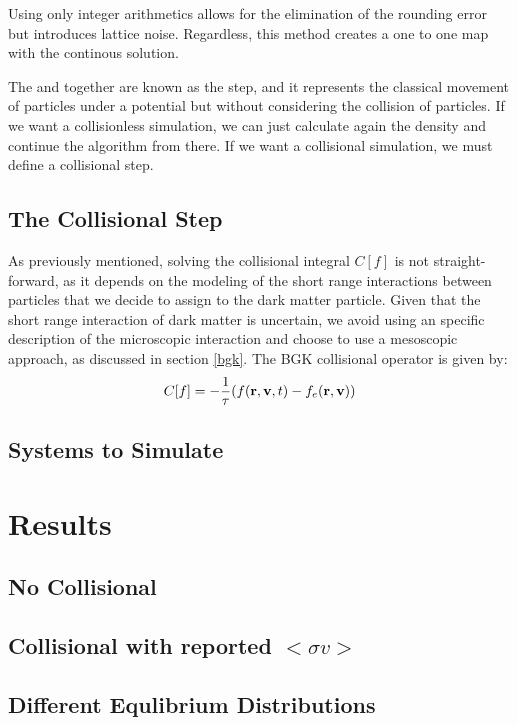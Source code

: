 Using only integer arithmetics allows for the elimination of the rounding error but introduces lattice noise. Regardless, this method creates a one to one map with the continous solution.\cite{franco} \cite{integerLatticeDynamics}

The  and  together are known as the  step, and it represents the classical movement of particles under a potential but without considering the collision of particles. If we want a collisionless simulation, we can just calculate again the density and continue the algorithm from there. If we want a collisional simulation, we must define a collisional step.

\section{The Collisional Step}
As previously mentioned, solving the collisional integral $C[f]$ is not straight-forward, as it depends on the modeling of the short range interactions between particles that we decide to assign to the dark matter particle. Given that the short range interaction of dark matter is uncertain, we avoid using an specific description of the microscopic interaction and choose to use a mesoscopic approach, as discussed in section \ref{bgk}. The BGK collisional operator is given by:\\
\begin{equation}
C[f] = -\frac{1}{\tau}(\f - f_e(\rv))
\end{equation}

\section{Systems to Simulate}

















\chapter{Results}
\section{No Collisional}
\section{Collisional with reported $<\sigma v>$}
\section{Different Equlibrium Distributions}